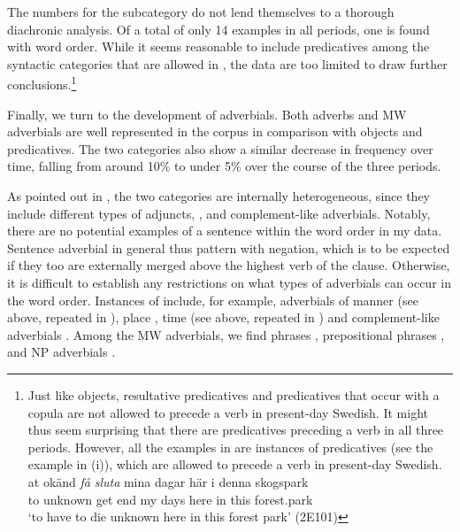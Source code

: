 \documentclass[output=paper, colorlinks, citecolor=brown]{langscibook}
\begin{document}
The numbers for the  subcategory do not lend themselves to a thorough diachronic analysis. Of a total of only 14 examples in all periods, one is found with  word order. While it seems reasonable to include predicatives among the syntactic categories that are allowed in , the data are too limited to draw further conclusions.\footnote{Just like objects, resultative predicatives and predicatives that occur with a copula are not allowed to precede a verb in present-day Swedish. It might thus seem surprising that there are predicatives preceding a verb in all three periods. However, all the examples in  are instances of  predicatives (see the example in (i)), which are allowed to precede a verb in present-day Swedish.  
\ea \gll at okänd \textit{få} \textit{sluta} mina  dagar  här  i  denna  skogspark\\
         to unknown  get  end  my  days  here  in  this  forest.park\\
     \glt ‘to have to die unknown here in this forest park’ (2E101)
\z}



Finally, we turn to the development of adverbials. Both adverbs and MW adverbials are well represented in the corpus in comparison with objects and predicatives. The two  categories also show a similar decrease in frequency over time, falling from around 10\% to under 5\% over the course of the three periods.\largerpage[3]



As pointed out in , the two  categories are internally heterogeneous, since they include different types of adjuncts, , and complement-like adverbials. Notably, there are no potential examples of a sentence  within the  word order in my data. Sentence adverbial in general thus pattern with negation, which is to be expected if they too are externally merged above the highest verb of the clause. Otherwise, it is difficult to establish any restrictions on what types of adverbials can occur in the  word order. Instances of  include, for example, adverbials of manner (see  above, repeated in ), place , time (see  above, repeated in ) and complement-like adverbials . Among the MW adverbials, we find  phrases , prepositional phrases , and NP adverbials .
\end{document}
